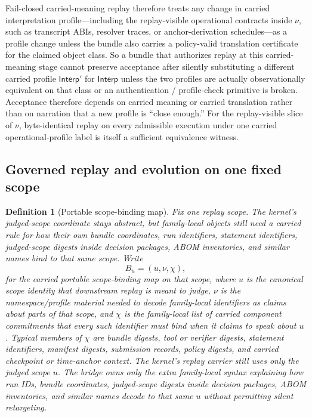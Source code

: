 \documentclass[11pt]{article}
\newtheorem{definition}{Definition}
\newcommand{\Interp}{\mathsf{Interp}}
\begin{document}
Fail-closed carried-meaning replay therefore treats any change in carried interpretation profile---including the replay-visible operational contracts inside $\nu$, such as transcript ABIs, resolver traces, or anchor-derivation schedules---as a profile change unless the bundle also carries a policy-valid translation certificate for the claimed object class.
So a bundle that authorizes replay at this carried-meaning stage cannot preserve acceptance after silently substituting a different carried profile $\Interp'$ for $\Interp$ unless the two profiles are actually observationally equivalent on that class or an authentication / profile-check primitive is broken.
Acceptance therefore depends on carried meaning or carried translation rather than on narration that a new profile is ``close enough.''
For the replay-visible slice of $\nu$, byte-identical replay on every admissible execution under one carried operational-profile label is itself a sufficient equivalence witness.


\subsection*{Governed replay and evolution on one fixed scope}

\begin{definition}[Portable scope-binding map]
Fix one replay scope.
The kernel's judged-scope coordinate stays abstract, but family-local objects still need a carried rule for how their own bundle coordinates, run identifiers, statement identifiers, judged-scope digests inside decision packages, ABOM inventories, and similar names bind to that same scope.
Write
\[
B_u=(u,\nu,\chi),
\]
for the carried portable scope-binding map on that scope, where $u$ is the canonical scope identity that downstream replay is meant to judge, $\nu$ is the namespace/profile material needed to decode family-local identifiers as claims about parts of that scope, and $\chi$ is the family-local list of carried component commitments that every such identifier must bind when it claims to speak about $u$.
Typical members of $\chi$ are bundle digests, tool or verifier digests, statement identifiers, manifest digests, submission records, policy digests, and carried checkpoint or time-anchor context.
The kernel's replay carrier still uses only the judged scope $u$.
The bridge owns only the extra family-local syntax explaining how run IDs, bundle coordinates, judged-scope digests inside decision packages, ABOM inventories, and similar names decode to that same $u$ without permitting silent retargeting.
\end{definition}
\end{document}
